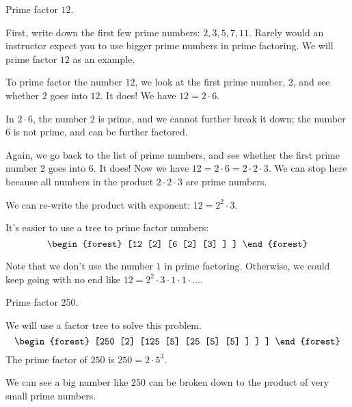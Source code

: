 \begin{myexample}
Prime factor $12$.
\end{myexample}
\begin{solution}
First, write down the first few prime numbers: $2,3,5,7,11$. Rarely would an instructor expect you to use bigger prime numbers in prime factoring. We will prime factor $12$ as an example.

To prime factor the number $12$, we look at the first prime number, $2$, and see whether $2$ goes into $12$. It does! We have $12=2\cdot6$.

In $2\cdot6$, the number $2$ is prime, and we cannot further break it down; the number $6$ is not prime, and can be further factored.

Again, we go back to the list of prime numbers, and see whether the first prime number $2$ goes into $6$. It does! Now we have $12=2\cdot6=2\cdot2\cdot3$. We can stop here because all numbers in the product $2\cdot2\cdot3$ are prime numbers.

We can re-write the product with exponent: $12=2^{2}\cdot3$.

It's easier to use a tree to prime factor numbers:
\[
\begin{forest}
   [12
      [2]
      [6
         [2]
         [3]
      ]
   ]
\end{forest}
\]
\end{solution}

Note that we don't use the number $1$ in prime factoring. Otherwise, we could keep going with no end like $12=2^{2}\cdot3\cdot1\cdot1\cdot...$.

\begin{myexample}
Prime factor 250.
\end{myexample}
\begin{solution}
We will use a factor tree to solve this problem.
\[
\begin{forest}
   [250
      [2]
      [125
         [5]
         [25
            [5]
            [5]
         ]
      ]
   ]
\end{forest}
\]
The prime factor of $250$ is $250=2\cdot5^{3}$.
\end{solution}

We can see a big number like $250$ can be broken down to the product of very small prime numbers.

